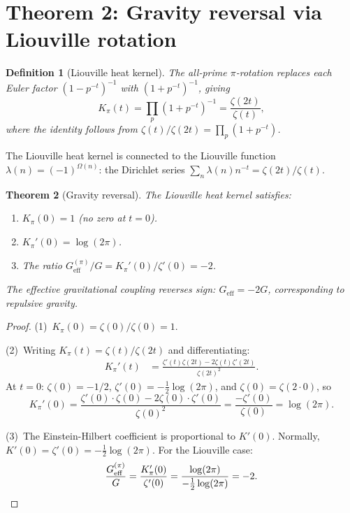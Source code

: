 \documentclass[aps,prd,twocolumn,superscriptaddress,nofootinbib]{revtex4-2}
\newtheorem{theorem}{Theorem}
\newtheorem{definition}[theorem]{Definition}
\begin{document}
\section{Theorem 2: Gravity reversal via Liouville rotation}
\label{sec:reversal}

\begin{definition}[Liouville heat kernel]
The all-prime $\pi$-rotation replaces each Euler factor
$(1 - p^{-t})^{-1}$ with $(1 + p^{-t})^{-1}$, giving
\begin{equation}
  K_\pi(t) = \prod_p(1 + p^{-t})^{-1} = \frac{\zeta(2t)}{\zeta(t)},
  \label{eq:liouville}
\end{equation}
where the identity follows from
$\zeta(t)/\zeta(2t) = \prod_p(1 + p^{-t})$.
\end{definition}

The Liouville heat kernel is connected to the Liouville function
$\lambda(n) = (-1)^{\Omega(n)}$: the Dirichlet series
$\sum_n \lambda(n) n^{-t} = \zeta(2t)/\zeta(t)$.

\begin{theorem}[Gravity reversal]
\label{thm:reversal}
The Liouville heat kernel satisfies:
\begin{enumerate}
\item $K_\pi(0) = 1$ (no zero at $t = 0$).
\item $K_\pi'(0) = \log(2\pi)$.
\item The ratio $G_{\mathrm{eff}}^{(\pi)} / G = K_\pi'(0) / \zeta'(0) = -2$.
\end{enumerate}
The effective gravitational coupling reverses sign:
$G_{\mathrm{eff}} = -2G$, corresponding to repulsive gravity.
\end{theorem}

\begin{proof}
(1)~$K_\pi(0) = \zeta(0)/\zeta(0) = 1$.

\noindent(2)~Writing $K_\pi(t) = \zeta(t)/\zeta(2t)$ and differentiating:
\begin{align}
  K_\pi'(t) &= \frac{\zeta'(t)\zeta(2t) - 2\zeta(t)\zeta'(2t)}{\zeta(2t)^2}.
\end{align}
At $t = 0$: $\zeta(0) = -1/2$, $\zeta'(0) = -\tfrac{1}{2}\log(2\pi)$,
and $\zeta(0) = \zeta(2 \cdot 0)$, so
\begin{equation}
  K_\pi'(0) = \frac{\zeta'(0) \cdot \zeta(0) - 2\zeta(0)\cdot\zeta'(0)}
  {\zeta(0)^2} = \frac{-\zeta'(0)}{\zeta(0)} = \log(2\pi).
\end{equation}

\noindent(3)~The Einstein-Hilbert coefficient is proportional to
$K'(0)$.  Normally, $K'(0) = \zeta'(0) = -\tfrac{1}{2}\log(2\pi)$.
For the Liouville case:
\begin{equation}
  \frac{G_{\mathrm{eff}}^{(\pi)}}{G}
  = \frac{K_\pi'(0)}{\zeta'(0)}
  = \frac{\log(2\pi)}{-\tfrac{1}{2}\log(2\pi)}
  = -2. \qedhere
\end{equation}
\end{proof}
\end{document}
